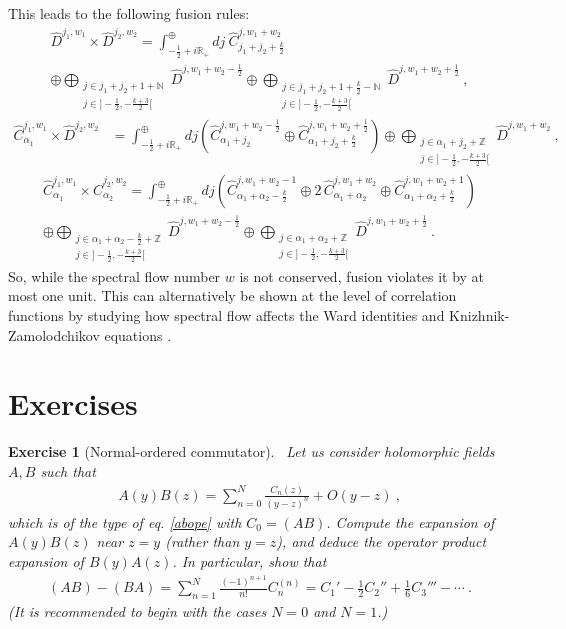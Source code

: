 \documentclass[12pt, a4paper, notitlepage, twoside]{report}
\numberwithin{equation}{section}
\theoremstyle{break}
\newtheorem{exo}{Exercise}[chapter]
\begin{document}
This leads to the following fusion rules:
\begin{multline}
\hat{D}^{j_1,w_1}\times \hat{D}^{j_2,w_2} = \int^\oplus_{-\frac12+i{\mathbb{R}}_+} dj\ \hat{C}^{j,w_1+w_2}_{j_1+j_2+\frac{k}{2}} 
\\ \oplus 
\bigoplus_{\substack{j\in j_1+j_2+1+{\mathbb{N}} \\ j\in ]-\frac12, -\frac{k+3}{2}[}} \hat{D}^{j,w_1+w_2-\frac12} \oplus 
\bigoplus_{\substack{j\in j_1+j_2+1+\frac{k}{2}-{\mathbb{N}} \\ j\in ]-\frac12, -\frac{k+3}{2}[}} \hat{D}^{j,w_1+w_2+\frac12}\ ,
\end{multline}
\begin{align}
 \hat{C}^{j_1,w_1}_{\alpha_1}\times \hat{D}^{j_2,w_2} &= \int^\oplus_{-\frac12+i{\mathbb{R}}_+} dj\left( \hat{C}^{j,w_1+w_2-\frac12}_{\alpha_1+j_2} \oplus \hat{C}^{j,w_1+w_2+\frac12}_{\alpha_1+j_2+\frac{k}{2}}\right) \oplus \bigoplus_{\substack{j\in \alpha_1+j_2+{\mathbb{Z}} \\ j\in ]-\frac12, -\frac{k+3}{2}[}} \hat{D}^{j,w_1+w_2}\ ,
\end{align}
\begin{multline}
 \hat{C}^{j_1,w_1}_{\alpha_1}\times \hat{C}^{j_2,w_2}_{\alpha_2} = \int^\oplus_{-\frac12+i{\mathbb{R}}_+} dj \left(\hat{C}^{j,w_1+w_2-1}_{\alpha_1+\alpha_2-\frac{k}{2}} \oplus 2\, \hat{C}^{j,w_1+w_2}_{\alpha_1+\alpha_2} \oplus \hat{C}^{j,w_1+w_2+1}_{\alpha_1+\alpha_2+\frac{k}{2}}\right) 
\\
\oplus \bigoplus_{\substack{j\in \alpha_1+\alpha_2-\frac{k}{2}+{\mathbb{Z}} \\ j\in]-\frac12, -\frac{k+3}{2}[}} \hat{D}^{j,w_1+w_2-\frac12} 
\oplus \bigoplus_{\substack{j\in \alpha_1+\alpha_2+{\mathbb{Z}} \\ j\in]-\frac12, -\frac{k+3}{2}[}} \hat{D}^{j,w_1+w_2+\frac12} \ .
\end{multline}
So, while the spectral flow number $w$ is not conserved, fusion violates it by at most one unit.
This can alternatively be shown at the level of correlation functions by studying how spectral flow affects the Ward identities and Knizhnik-Zamolodchikov equations \cite{rib05}.

\section{Exercises}

\begin{exo}[Normal-ordered commutator]
~\label{exoabba}
Let us consider holomorphic fields $A,B$ such that 
\begin{align}
 A(y)B(z) = \sum_{n=0}^N \frac{C_n(z)}{(y-z)^n} + O(y-z)\ ,
\end{align}
which is of the type of eq. \eqref{abope} with $C_0 = (AB)$. 
Compute the expansion of $A(y)B(z)$ near $z=y$ (rather than $y=z$), and deduce the operator product expansion of $B(y)A(z)$. 
In particular, show that 
\begin{align}
 (AB)-(BA) = \sum_{n=1}^N \frac{(-1)^{n+1}}{n!} C_n^{(n)} = C_1'-\frac12 C_2'' + \frac16 C_3''' -\cdots \ .
\end{align}
(It is recommended to begin with the cases $N=0$ and $N=1$.)
\end{exo}
\end{document}
